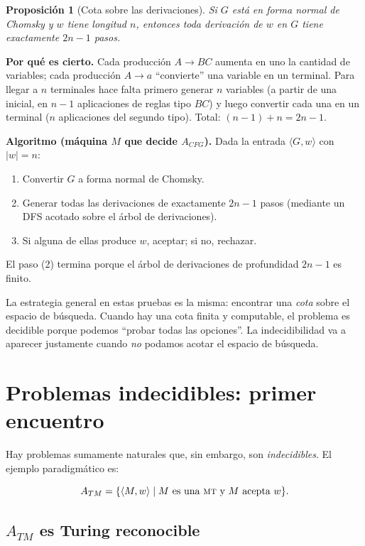\documentclass[11pt,a4paper]{article}
\theoremstyle{definicion}
\newtheorem{proposicion}[definicion]{Proposición}
\newcommand{\MT}{\textsc{mt}}
\newcommand{\enc}[1]{\langle #1 \rangle}
\begin{document}
\begin{proposicion}[Cota sobre las derivaciones]
Si $G$ está en forma normal de Chomsky y $w$ tiene longitud $n$, entonces toda derivación de $w$ en $G$ tiene exactamente $2n - 1$ pasos.
\end{proposicion}

\textbf{Por qué es cierto.} Cada producción $A \to BC$ aumenta en uno la cantidad de variables; cada producción $A \to a$ ``convierte'' una variable en un terminal. Para llegar a $n$ terminales hace falta primero generar $n$ variables (a partir de una inicial, en $n-1$ aplicaciones de reglas tipo $BC$) y luego convertir cada una en un terminal ($n$ aplicaciones del segundo tipo). Total: $(n - 1) + n = 2n - 1$.

\textbf{Algoritmo (máquina $M$ que decide $A_{CFG}$).} Dada la entrada $\enc{G, w}$ con $|w| = n$:
\begin{enumerate}
    \item Convertir $G$ a forma normal de Chomsky.
    \item Generar todas las derivaciones de exactamente $2n - 1$ pasos (mediante un DFS acotado sobre el árbol de derivaciones).
    \item Si alguna de ellas produce $w$, aceptar; si no, rechazar.
\end{enumerate}

El paso (2) termina porque el árbol de derivaciones de profundidad $2n - 1$ es finito.

\begin{intuicion}
La estrategia general en estas pruebas es la misma: encontrar una \emph{cota} sobre el espacio de búsqueda. Cuando hay una cota finita y computable, el problema es decidible porque podemos ``probar todas las opciones''. La indecidibilidad va a aparecer justamente cuando \emph{no} podamos acotar el espacio de búsqueda.
\end{intuicion}

\section{Problemas indecidibles: primer encuentro}

Hay problemas sumamente naturales que, sin embargo, son \emph{indecidibles}. El ejemplo paradigmático es:

\[
A_{TM} = \{ \enc{M, w} \mid M \text{ es una \MT\ y } M \text{ acepta } w \}.
\]

\subsection{$A_{TM}$ es Turing reconocible}
\end{document}
